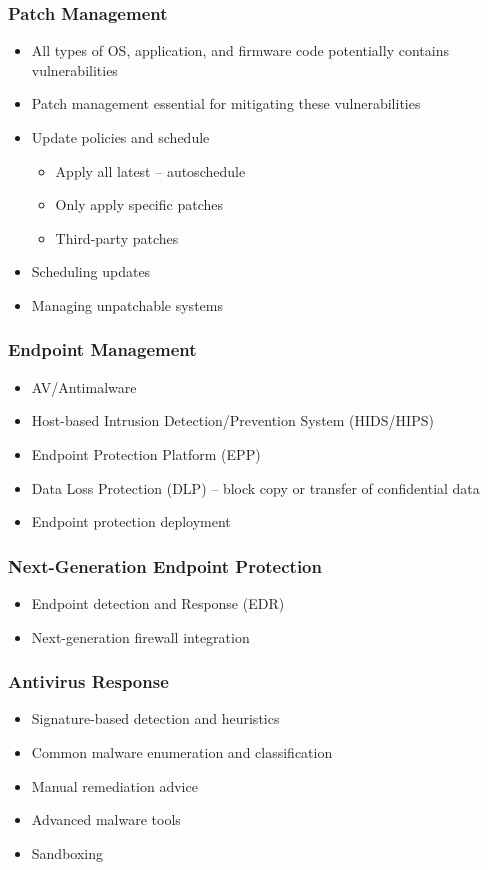 		\subsubsection {Patch Management}
			\begin{itemize}
				\item All types of OS, application, and firmware code potentially
					contains vulnerabilities
				\item Patch management essential for mitigating these vulnerabilities
				\item Update policies and schedule
					\begin{itemize}
						\item Apply all latest -- autoschedule
						\item Only apply specific patches
						\item Third-party patches
					\end{itemize}
				\item Scheduling updates
				\item Managing unpatchable systems
			\end{itemize}
		\subsubsection {Endpoint Management}
			\begin{itemize}
				\item AV/Antimalware
				\item Host-based Intrusion Detection/Prevention System (HIDS/HIPS)
				\item Endpoint Protection Platform (EPP)
				\item Data Loss Protection (DLP) -- block copy or transfer of 
					confidential data
				\item Endpoint protection deployment
			\end{itemize}
		\subsubsection {Next-Generation Endpoint Protection}
			\begin{itemize}
				\item Endpoint detection and Response (EDR)
				\item Next-generation firewall integration
			\end{itemize}
		\subsubsection {Antivirus Response}
			\begin{itemize}
				\item Signature-based detection and heuristics
				\item Common malware enumeration and classification
				\item Manual remediation advice
				\item Advanced malware tools
				\item Sandboxing
			\end{itemize}

